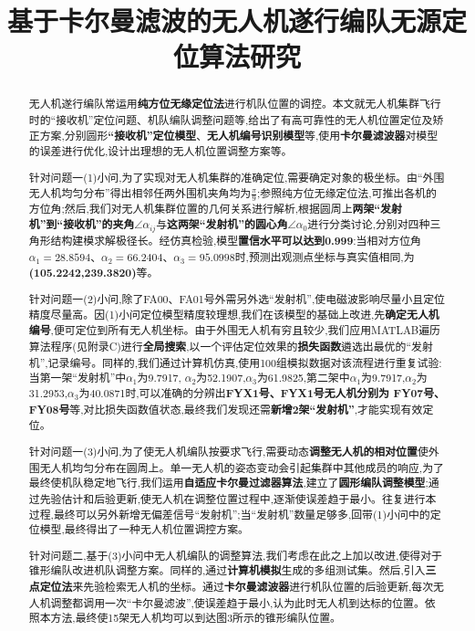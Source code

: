 \documentclass[withoutpreface,bwprint]{cumcmthesis} %
\title{基于卡尔曼滤波的无人机遂行编队无源定位算法研究}
\begin{document}
	\maketitle
	\begin{abstract}
		无人机遂行编队常运用\textbf{纯方位无缘定位法}进行机队位置的调控。本文就无人机集群飞行时的“接收机”定位问题、机队编队调整问题等,给出了有高可靠性的无人机位置定位及矫正方案,分别圆形\textbf{“接收机”定位模型}、\textbf{无人机编号识别模型}等,使用\textbf{卡尔曼滤波器}对模型的误差进行优化,设计出理想的无人机位置调整方案等。
		
		针对问题一(1)小问,为了实现对无人机集群的准确定位,需要确定对象的极坐标。由“外围无人机均匀分布”得出相邻任两外围机夹角均为$\frac{\pi}{9}$;参照纯方位无缘定位法,可推出各机的方位角;然后,我们对无人机集群位置的几何关系进行解析,根据圆周上\textbf{两架“发射机”到“接收机”的夹角$\angle \alpha_{ij}$}与\textbf{这两架“发射机”的圆心角$\angle \alpha_{0}$}进行分类讨论,分别对四种三角形结构建模求解极径长。经仿真检验,模型\textbf{置信水平可以达到0.999}:当相对方位角$\alpha_{1}=28.8594$、$\alpha_{2}=66.2404$、$\alpha_{3}=95.0998$时,预测出观测点坐标与真实值相同,为\textbf{(105.2242,239.3820\textdegree)}等。
		
		针对问题一(2)小问,除了FA00、FA01号外需另外选“发射机”,使电磁波影响尽量小且定位精度尽量高。因(1)小问定位模型精度较理想,我们在该模型的基础上改进,先\textbf{确定无人机编号},便可定位到所有无人机坐标。由于外围无人机有穷且较少,我们应用MATLAB遍历算法程序(见附录C)进行\textbf{全局搜索},以一个评估定位效果的\textbf{损失函数}遴选出最优的“发射机”,记录编号。同样的,我们通过计算机仿真,使用100组模拟数据对该流程进行重复试验:当第一架“发射机”中$\alpha_{1}$为9.7917,	$\alpha_{2}$为52.1907,$\alpha_{3}$为61.9825,第二架中$\alpha_{1}$为9.7917,$\alpha_{2}$为31.2953,$\alpha_{3}$为40.0871时,可以准确的分辨出\textbf{FYX1号、FYX1号无人机分别为 FY07号、FY08号}等,对比损失函数值状态,最终我们发现还需\textbf{新增2架“发射机”},才能实现有效定位。
			
		针对问题一(3)小问,为了使无人机编队按要求飞行,需要动态\textbf{调整无人机的相对位置}使外围无人机均匀分布在圆周上。单一无人机的姿态变动会引起集群中其他成员的响应,为了最终使机队稳定地飞行,我们运用\textbf{自适应卡尔曼过滤器算法},建立了\textbf{圆形编队调整模型};通过先验估计和后验更新,使无人机在调整位置过程中,逐渐使误差趋于最小。往复进行本过程,最终可以另外新增无偏差信号“发射机”;当“发射机”数量足够多,回带(1)小问中的定位模型,最终得出了一种无人机位置调控方案。
		
		针对问题二,基于(3)小问中无人机编队的调整算法,我们考虑在此之上加以改进,使得对于锥形编队改进机队调整方案。同样的,通过\textbf{计算机模拟}生成的多组测试集。然后,引入\textbf{三点定位法}来先验检索无人机的坐标。通过\textbf{卡尔曼滤波器}进行机队位置的后验更新,每次无人机调整都调用一次“卡尔曼滤波”,使误差趋于最小,认为此时无人机到达标的位置。依照本方法,最终使15架无人机均可以到达图3所示的锥形编队位置。
		
	\end{abstract}
\end{document}
